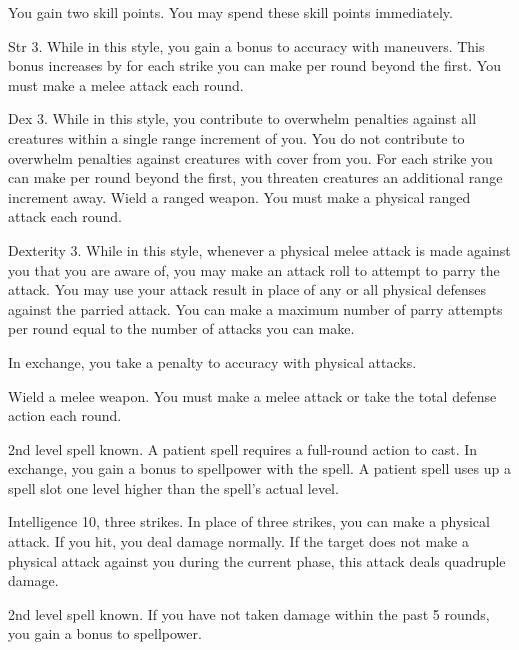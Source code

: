 \featben You gain two skill points.
You may spend these skill points immediately.

\featpre Str 3.
\featben While in this style, you gain a  bonus to accuracy with maneuvers.
This bonus increases by  for each strike you can make per round beyond the first.
\stylereq You must make a melee attack each round.

\featpre Dex 3.
\featben While in this style, you contribute to overwhelm penalties against all creatures within a single range increment of you.
You do not contribute to overwhelm penalties against creatures with cover from you.
For each strike you can make per round beyond the first, you threaten creatures an additional range increment away.
\stylereq Wield a ranged weapon.
You must make a physical ranged attack each round.

\featpre Dexterity 3.
\featben While in this style, whenever a physical melee attack is made against you that you are aware of, you may make an attack roll to attempt to parry the attack.
You may use your attack result in place of any or all physical defenses against the parried attack.
You can make a maximum number of parry attempts per round equal to the number of attacks you can make.

In exchange, you take a  penalty to accuracy with physical attacks.

\stylereq Wield a melee weapon.
You must make a melee attack or take the total defense action each round.

\featpre 2nd level spell known.
\featben A patient spell requires a full-round action to cast.
In exchange, you gain a  bonus to spellpower with the spell.
A patient spell uses up a spell slot one level higher than the spell's actual level.

\featpre Intelligence 10, three strikes.
\featben In place of three strikes, you can make a physical attack.
If you hit, you deal damage normally.
If the target does not make a physical attack against you during the current phase, this attack deals quadruple damage.

\featpre 2nd level spell known.
\featben If you have not taken damage within the past 5 rounds, you gain a  bonus to spellpower.

